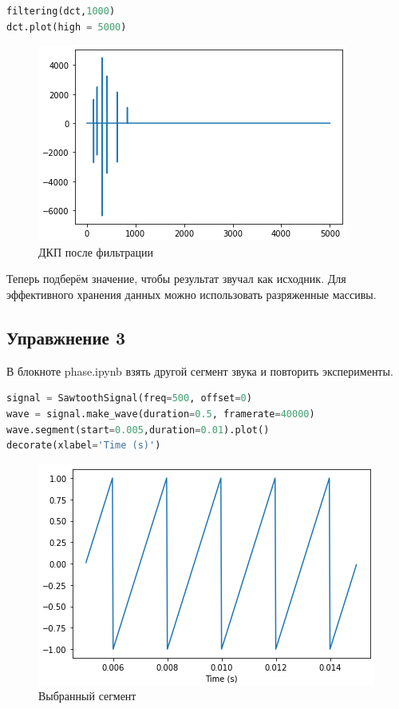 \begin{lstlisting}[language=Python]
filtering(dct,1000)
dct.plot(high = 5000)
\end{lstlisting}
\begin{figure}[H]
	\begin{center}
		\includegraphics[scale=1]{fig/lab06/lab6_3.png}
		\caption{ДКП после фильтрации}
	\end{center}
\end{figure}

Теперь подберём значение, чтобы результат звучал как исходник. Для эффективного хранения данных можно использовать разряженные массивы.

\subsection{Управжнение 3}

В блокноте phase.ipynb взять другой сегмент звука и повторить эксперименты.

\begin{lstlisting}[language=Python]
signal = SawtoothSignal(freq=500, offset=0)
wave = signal.make_wave(duration=0.5, framerate=40000)
wave.segment(start=0.005,duration=0.01).plot()
decorate(xlabel='Time (s)')
\end{lstlisting}
\begin{figure}[H]
	\begin{center}
		\includegraphics[scale=1]{fig/lab06/lab6_4.png}
		\caption{Выбранный сегмент}
	\end{center}
\end{figure}


